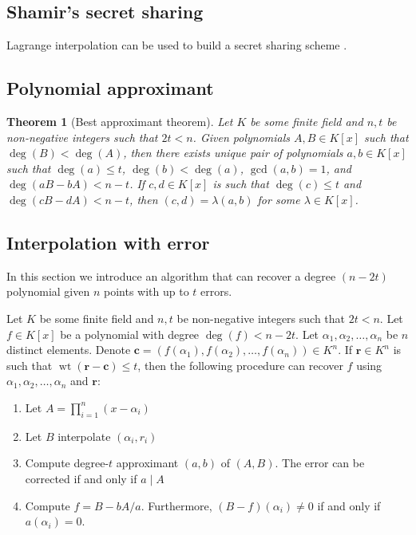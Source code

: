 \documentclass{article}
\newtheorem{theorem}{Theorem}[section]
\begin{document}
\subsection{Shamir's secret sharing}
Lagrange interpolation can be used to build a secret sharing scheme \cite{shamir1979share}.


\subsection{Polynomial approximant}

\begin{theorem}[Best approximant theorem]\label{thm:best-approximant-theorem}
    Let $K$ be some finite field and $n, t$ be non-negative integers such that $2t < n$. Given polynomials $A, B \in K[x]$ such that $\deg(B) < \deg(A)$, then there exists unique pair of polynomials $a, b \in K[x]$ such that $\deg(a) \leq t$, $\deg(b) < \deg(a)$, $\gcd(a, b) = 1$, and $\deg(aB - bA) < n - t$. If $c, d \in K[x]$ is such that $\deg(c) \leq t$ and $\deg(cB - dA) < n - t$, then $(c, d) = \lambda (a, b)$ for some $\lambda \in K[x]$.
\end{theorem}


\subsection{Interpolation with error}
In this section we introduce an algorithm that can recover a degree $(n - 2t)$ polynomial given $n$ points with up to $t$ errors.

Let $K$ be some finite field and $n, t$ be non-negative integers such that $2t < n$. Let $f \in K[x]$ be a polynomial with degree $\deg(f) < n - 2t$. Let $\alpha_1, \alpha_2, \ldots, \alpha_n$ be $n$ distinct elements. Denote $\mathbf{c} = (f(\alpha_1), f(\alpha_2), \ldots, f(\alpha_n)) \in K^n$. If $\mathbf{r} \in K^n$ is such that $\mathop{wt}(\mathbf{r} - \mathbf{c}) \leq t$, then the following procedure can recover $f$ using $\alpha_1, \alpha_2, \ldots, \alpha_n$ and $\mathbf{r}$: \begin{enumerate}
    \item Let $A = \prod_{i=1}^n (x - \alpha_i)$
    \item Let $B$ interpolate $(\alpha_i, r_i)$
    \item Compute degree-$t$ approximant $(a, b)$ of $(A, B)$. The error can be corrected if and only if $a \mid A$
    \item Compute $f = B - bA / a$. Furthermore, $(B - f)(\alpha_i) \neq 0$ if and only if $a(\alpha_i) = 0$.
\end{enumerate}
\end{document}
